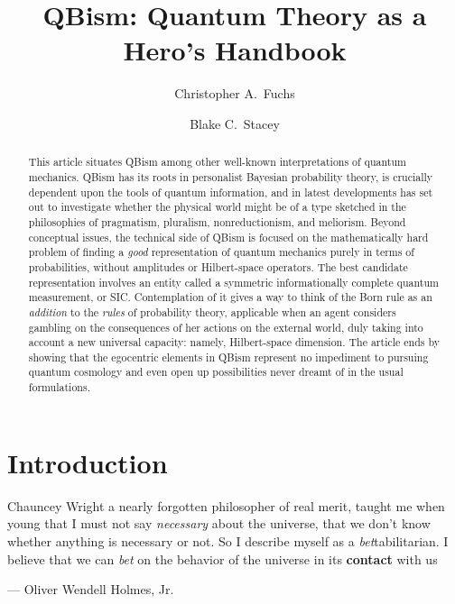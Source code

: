 \documentclass[aps,pra,superscriptaddress,12pt,tightenlines,nofootinbib]{revtex4-2}
\begin{document}
\title{QBism: Quantum Theory as a Hero's Handbook}
\author{Christopher A.\ Fuchs}
\author{Blake C.\ Stacey}


\begin{abstract}
This article situates QBism among other well-known interpretations of quantum mechanics.  QBism has its roots in personalist Bayesian probability theory, is crucially dependent upon the tools of quantum information, and in latest developments has set out to investigate whether the physical world might be of a type sketched in the philosophies of pragmatism, pluralism, nonreductionism, and meliorism.  Beyond conceptual issues, the technical side of QBism is focused on the mathematically hard problem of finding a {\it good\/} representation of quantum mechanics purely in terms of probabilities, without amplitudes or Hilbert-space operators.  The best candidate representation involves an entity called a symmetric informationally complete quantum measurement, or SIC\@.  Contemplation of it gives a way to think of the Born rule as an {\it addition\/} to the {\it rules\/} of probability theory, applicable when an agent considers gambling on the consequences of her actions on the external world, duly taking into account a new universal capacity:  namely, Hilbert-space dimension.  The article ends by showing that the egocentric elements in QBism represent no impediment to pursuing quantum cosmology and even open up possibilities never dreamt of in the usual formulations.
\end{abstract}

\maketitle


\newpage

\section{Introduction}

\begin{flushright}
\baselineskip=13pt
\parbox{2.8in}{\baselineskip=13pt\small
Chauncey Wright a nearly forgotten philosopher of real merit, taught me when young that I must not say {\it necessary\/} about the universe, that we don't know whether anything is necessary or not.  So I describe myself as a {\it bet\/}tabilitarian.  I believe that we can {\it bet\/} on the behavior of the universe in its {\bf contact} with us}
\medskip

\small --- Oliver Wendell Holmes, Jr.
\end{flushright}
\end{document}

